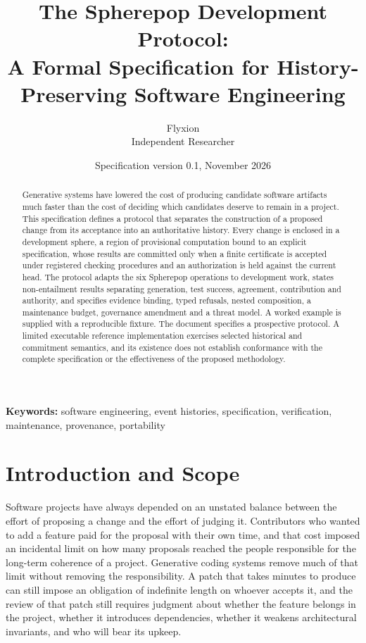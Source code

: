 \documentclass[11pt]{article}
\title{The Spherepop Development Protocol:\\
A Formal Specification for History-Preserving Software Engineering}
\author{Flyxion\\Independent Researcher}
\date{Specification version 0.1, November 2026}
\theoremstyle{remark}
\begin{document}
\maketitle
\thispagestyle{empty}

\begin{abstract}
\noindent
Generative systems have lowered the cost of producing candidate software artifacts much faster than the cost of deciding which candidates deserve to remain in a project. This specification defines a protocol that separates the construction of a proposed change from its acceptance into an authoritative history. Every change is enclosed in a development sphere, a region of provisional computation bound to an explicit specification, whose results are committed only when a finite certificate is accepted under registered checking procedures and an authorization is held against the current head. The protocol adapts the six Spherepop operations to development work, states non-entailment results separating generation, test success, agreement, contribution and authority, and specifies evidence binding, typed refusals, nested composition, a maintenance budget, governance amendment and a threat model. A worked example is supplied with a reproducible fixture. The document specifies a prospective protocol. A limited executable reference implementation exercises selected historical and commitment semantics, and its existence does not establish conformance with the complete specification or the effectiveness of the proposed methodology.
\end{abstract}

\vspace{2.5em}
\noindent\textbf{Keywords:} software engineering, event histories, specification, verification, maintenance, provenance, portability

\newpage

\section{Introduction and Scope}

Software projects have always depended on an unstated balance between the effort of proposing a change and the effort of judging it. Contributors who wanted to add a feature paid for the proposal with their own time, and that cost imposed an incidental limit on how many proposals reached the people responsible for the long-term coherence of a project. Generative coding systems remove much of that limit without removing the responsibility. A patch that takes minutes to produce can still impose an obligation of indefinite length on whoever accepts it, and the review of that patch still requires judgment about whether the feature belongs in the project, whether it introduces dependencies, whether it weakens architectural invariants, and who will bear its upkeep.
\end{document}
